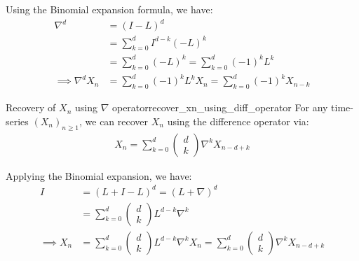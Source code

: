 \begin{proof*}
    Using the Binomial expansion formula, we have:
    \begin{align*}
        \nabla^d &= (I - L)^d \\
        &= \sum_{k=0}^d I^{d-k}(-L)^k \\
        &= \sum_{k=0}^d (-L)^k = \sum_{k=0}^d (-1)^k L^k \\
        \implies \nabla^dX_n &= \sum_{k=0}^d (-1)^k L^k X_n = \sum_{k=0}^d (-1)^kX_{n-k}
    \end{align*}
\end{proof*}

\begin{proposition}{Recovery of $X_n$ using $\nabla$ operator}{recover_xn_using_diff_operator}
    For any time-series $(X_n)_{n\ge1}$, we can recover $X_n$ using the difference operator via:
    \begin{align*}
        X_n = \sum_{k=0}^d \begin{pmatrix}
            d \\ k
        \end{pmatrix} \nabla^k X_{n-d+k}
    \end{align*}
\end{proposition}

\begin{proof*}
    Applying the Binomial expansion, we have:
    \begin{align*}
        I &= (L + I - L)^d = (L + \nabla)^d \\
            &= \sum_{k=0}^d \begin{pmatrix}
                d \\ k
            \end{pmatrix} L^{d-k} \nabla^k \\
            \implies X_n &= \sum_{k=0}^d \begin{pmatrix}
                d \\ k
            \end{pmatrix} L^{d-k} \nabla^k X_n = \sum_{k=0}^d \begin{pmatrix}
                d \\ k
            \end{pmatrix} \nabla^k X_{n-d+k}
    \end{align*}
\end{proof*}


